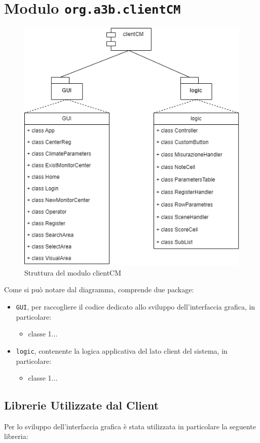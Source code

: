 \chapter{Modulo \texttt{org.a3b.clientCM}}
\label{ch:client}

\begin{figure}[h]
	\centering
	\caption{Struttura del modulo clientCM}
	\label{fig:clientcm}
	\includegraphics[width=0.8\linewidth]{../../fig/img/tecnico/clientCM.drawio}
\end{figure}

\pagebreak
Come si può notare dal diagramma, comprende due package:
\begin{itemize}
	\item \texttt{GUI}, per raccogliere il codice dedicato allo sviluppo dell'interfaccia grafica, in particolare:
	\begin{itemize}
		\item classe 1...
	\end{itemize}
	\item \texttt{logic}, contenente la logica applicativa del lato client del sistema, in particolare:
	\begin{itemize}
		\item classe 1...
	\end{itemize}
\end{itemize}

\section{Librerie Utilizzate dal Client}
Per lo sviluppo dell'interfaccia grafica è stata utilizzata in particolare la seguente libreria:

